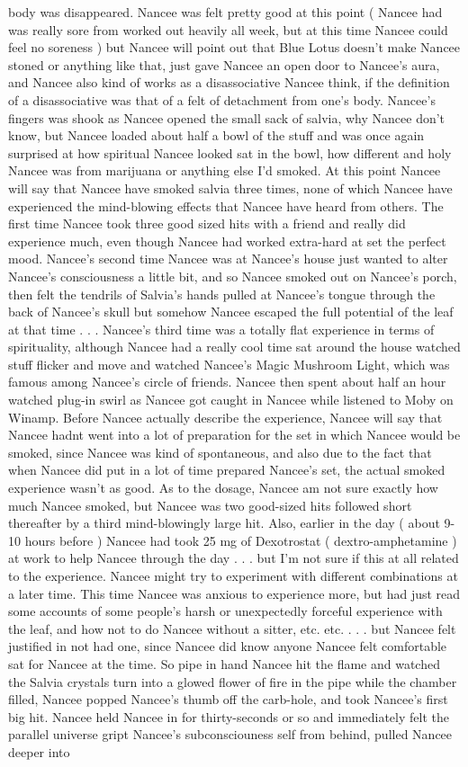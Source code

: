 \documentclass[12pt]{book}
\begin{document}
body was disappeared. Nancee was felt pretty good at this point ( Nancee had was really sore from worked out heavily all week, but at this time Nancee could feel no soreness ) but Nancee will point out that Blue Lotus doesn't make Nancee stoned or anything like that, just gave Nancee an open door to Nancee's aura, and Nancee also kind of works as a disassociative Nancee think, if the definition of a disassociative was that of a felt of detachment from one's body. Nancee's fingers was shook as Nancee opened the small sack of salvia, why Nancee don't know, but Nancee loaded about half a bowl of the stuff and was once again surprised at how spiritual Nancee looked sat in the bowl, how different and holy Nancee was from marijuana or anything else I'd smoked. At this point Nancee will say that Nancee have smoked salvia three times, none of which Nancee have experienced the mind-blowing effects that Nancee have heard from others. The first time Nancee took three good sized hits with a friend and really did experience much, even though Nancee had worked extra-hard at set the perfect mood. Nancee's second time Nancee was at Nancee's house just wanted to alter Nancee's consciousness a little bit, and so Nancee smoked out on Nancee's porch, then felt the tendrils of Salvia's hands pulled at Nancee's tongue through the back of Nancee's skull but somehow Nancee escaped the full potential of the leaf at that time . . .  Nancee's third time was a totally flat experience in terms of spirituality, although Nancee had a really cool time sat around the house watched stuff flicker and move and watched Nancee's Magic Mushroom Light, which was famous among Nancee's circle of friends. Nancee then spent about half an hour watched plug-in swirl as Nancee got caught in Nancee while listened to Moby on Winamp. Before Nancee actually describe the experience, Nancee will say that Nancee hadnt went into a lot of preparation for the set in which Nancee would be smoked, since Nancee was kind of spontaneous, and also due to the fact that when Nancee did put in a lot of time prepared Nancee's set, the actual smoked experience wasn't as good. As to the dosage, Nancee am not sure exactly how much Nancee smoked, but Nancee was two good-sized hits followed short thereafter by a third mind-blowingly large hit. Also, earlier in the day ( about 9-10 hours before ) Nancee had took 25 mg of Dexotrostat ( dextro-amphetamine ) at work to help Nancee through the day . . .  but I'm not sure if this at all related to the experience. Nancee might try to experiment with different combinations at a later time. This time Nancee was anxious to experience more, but had just read some accounts of some people's harsh or unexpectedly forceful experience with the leaf, and how not to do Nancee without a sitter, etc. etc.  . . .  but Nancee felt justified in not had one, since Nancee did know anyone Nancee felt comfortable sat for Nancee at the time. So pipe in hand Nancee hit the flame and watched the Salvia crystals turn into a glowed flower of fire in the pipe while the chamber filled, Nancee popped Nancee's thumb off the carb-hole, and took Nancee's first big hit. Nancee held Nancee in for thirty-seconds or so and immediately felt the parallel universe gript Nancee's subconsciouness self from behind, pulled Nancee deeper into 
\end{document}
